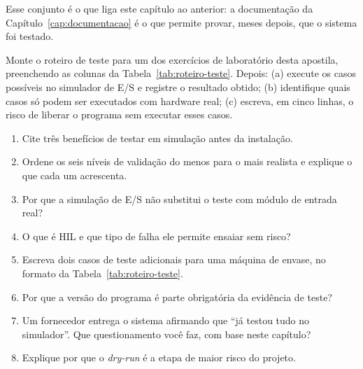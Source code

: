 Esse conjunto é o que liga este capítulo ao anterior: a documentação da
Capítulo~\ref{cap:documentacao} é o que permite provar, meses depois, que o sistema foi testado.

\begin{pratica}
Monte o roteiro de teste para um dos exercícios de laboratório desta apostila, preenchendo as colunas
da Tabela~\ref{tab:roteiro-teste}. Depois:
(a) execute os casos possíveis no simulador de E/S e registre o resultado obtido;
(b) identifique quais casos só podem ser executados com hardware real;
(c) escreva, em cinco linhas, o risco de liberar o programa sem executar esses casos.
\end{pratica}

\begin{exercicios}
\begin{enumerate}[label=\alph*)]
  \item Cite três benefícios de testar em simulação antes da instalação.
  \item Ordene os seis níveis de validação do menos para o mais realista e explique o que cada um
        acrescenta.
  \item Por que a simulação de E/S não substitui o teste com módulo de entrada real?
  \item O que é HIL e que tipo de falha ele permite ensaiar sem risco?
  \item Escreva dois casos de teste adicionais para uma máquina de envase, no formato da
        Tabela~\ref{tab:roteiro-teste}.
  \item Por que a versão do programa é parte obrigatória da evidência de teste?
  \item Um fornecedor entrega o sistema afirmando que ``já testou tudo no simulador''. Que
        questionamento você faz, com base neste capítulo?
  \item Explique por que o \emph{dry-run} é a etapa de maior risco do projeto.
\end{enumerate}
\end{exercicios}
